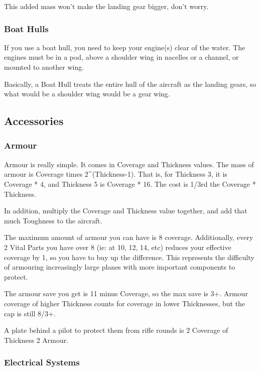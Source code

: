 \documentclass{article}
\begin{document}
This added mass won't make the landing gear bigger, don't worry.

\subsubsection{Boat Hulls}
\label{_Boat_Hulls}

If you use a boat hull, you need to keep your engine(s) clear of the
water. The engines must be in a pod, above a shoulder wing in nacelles
or a channel, or mounted to another wing.

Basically, a Boat Hull treats the entire hull of the aircraft as the
landing gears, so what would be a shoulder wing would be a gear wing.

\subsection{Accessories}
\label{_Upgrades}

\subsubsection{Armour}
\label{_Armour}

Armour is really simple. It comes in Coverage and Thickness values. The
mass of armour is Coverage times 2\^{}(Thickness-1). That is, for
Thickness 3, it is Coverage * 4, and Thickness 5 is Coverage * 16. The
cost is 1/3rd the Coverage * Thickness.

In addition, multiply the Coverage and Thickness value together, and add
that much Toughness to the aircraft.

The maximum amount of armour you can have is 8 coverage.
Additionally, every 2 Vital Parts you have over 8 (ie: at 10, 12, 14,
etc) reduces your effective coverage by 1, so you have to buy up the
difference. This represents the difficulty of armouring increasingly
large planes with more important components to protect.

The armour save you get is 11 minus Coverage, so the max save is
3+. Armour coverage of higher Thickness counts for coverage in lower
Thicknesses, but the cap is still 8/3+.

A plate behind a pilot to protect them from rifle rounds is 2
Coverage of Thickness 2 Armour.

\subsubsection{Electrical Systems}
\label{_Electrical Systems}
\end{document}
